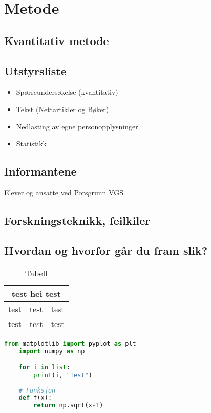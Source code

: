 \section{Metode}

\subsection{Kvantitativ metode}

\subsection{Utstyrsliste}
\begin{itemize}
    \item Spørreundersøkelse (kvantitativ)
    \item Tekst (Nettartikler og Bøker)
    \item Nedlasting av egne personopplysninger
    \item Statistikk
    \end{itemize}
    
\subsection{Informantene}
Elever og ansatte ved Porsgrunn VGS

\subsection{Forskningsteknikk, feilkiler}

\subsection{Hvordan og hvorfor går du fram slik?}


\newpage
\begin{table}[h]
    \begin{center}
        \begin{tabular}{|c|c|c|}
            \hline
            \multicolumn{3}{|c|}{test hei test}\\
            \hline\hline
            test & test & test \\
            \hline
            test & test & test \\
            \hline
        \end{tabular}
        \caption{Tabell}
    \end{center}
\end{table}

\begin{lstlisting}[language=Python, caption=Python eksempel]
    from matplotlib import pyplot as plt
    import numpy as np

    for i in list:
        print(i, "Test")
    
    # Funksjon
    def f(x):
        return np.sqrt(x-1)
\end{lstlisting}

\newpage